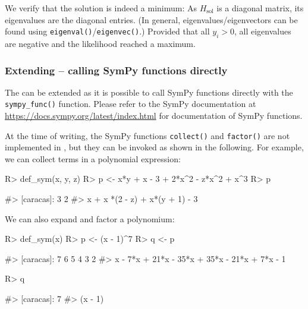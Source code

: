 We verify that the solution is indeed a minimum: As \(H_{\text{sol}}\)
is a diagonal matrix, its eigenvalues are the diagonal entries. (In
general, eigenvalues/eigenvectors can be found using
\texttt{eigenval()}/\texttt{eigenvec()}.) Provided that all \(y_i > 0\),
all eigenvalues are negative and the likelihood reached a maximum.

\hypertarget{extending-calling-sympy-functions-directly}{%
\subsubsection{\texorpdfstring{Extending  -- calling
SymPy functions
directly}{Extending  -- calling SymPy functions directly}}\label{extending-calling-sympy-functions-directly}}

The  can be extended as it is possible to call SymPy
functions directly with the \texttt{sympy\_func()} function. Please
refer to the SymPy documentation at
\url{https://docs.sympy.org/latest/index.html} for documentation of
SymPy functions.

At the time of writing, the SymPy functions \texttt{collect()} and
\texttt{factor()} are not implemented in , but they can
be invoked as shown in the following. For example, we can collect terms
in a polynomial expression:

\begin{Schunk}
\begin{Sinput}
R> def_sym(x, y, z)
R> p <- x*y + x - 3 + 2*x^2 - z*x^2 + x^3
R> p %
\end{Sinput}
\begin{Soutput}
#> [caracas]:  3    2                        
#>            x  + x *(2 - z) + x*(y + 1) - 3
\end{Soutput}
\end{Schunk}

We can also expand and factor a polynomium:

\begin{Schunk}
\begin{Sinput}
R> def_sym(x)
R> p <- (x - 1)^7
R> q <- p %
\end{Sinput}
\begin{Soutput}
#> [caracas]:  7      6       5       4       3       2          
#>            x  - 7*x  + 21*x  - 35*x  + 35*x  - 21*x  + 7*x - 1
\end{Soutput}
\begin{Sinput}
R> q %
\end{Sinput}
\begin{Soutput}
#> [caracas]:        7
#>            (x - 1)
\end{Soutput}
\end{Schunk}

